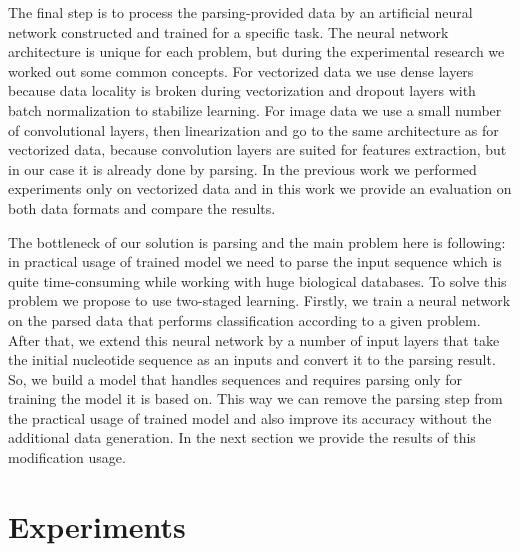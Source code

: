 \documentclass[12pt,a4paper]{cibb}
\begin{document}
The final step is to process the parsing-provided data by an artificial neural network constructed and trained for a specific task.
The neural network architecture is unique for each problem, but during the experimental research we worked out some common concepts.
For vectorized data we use dense layers because data locality is broken during vectorization and dropout layers with batch normalization to stabilize learning.
For image data we use a small number of convolutional layers, then linearization and go to the same architecture as for vectorized data, because convolution layers are suited for features extraction, but in our case it is already done by parsing.
In the previous work we performed experiments only on vectorized data and in this work we provide an evaluation on both data formats and compare the results.

The bottleneck of our solution is parsing and the main problem here is following: in practical usage of trained model we need to parse the input sequence which is quite time-consuming while working with huge biological databases.
To solve this problem we propose to use two-staged learning.
Firstly, we train a neural network on the parsed data that performs classification according to a given problem.
After that, we extend this neural network by a number of input layers that take the initial nucleotide sequence as an inputs and convert it to the parsing result.
So, we build a model that handles sequences and requires parsing only for training the model it is based on.
This way we can remove the parsing step from the practical usage of trained model and also improve its accuracy without the additional data generation.
In the next section we provide the results of this modification usage.


\section{\bf Experiments}
\end{document}
